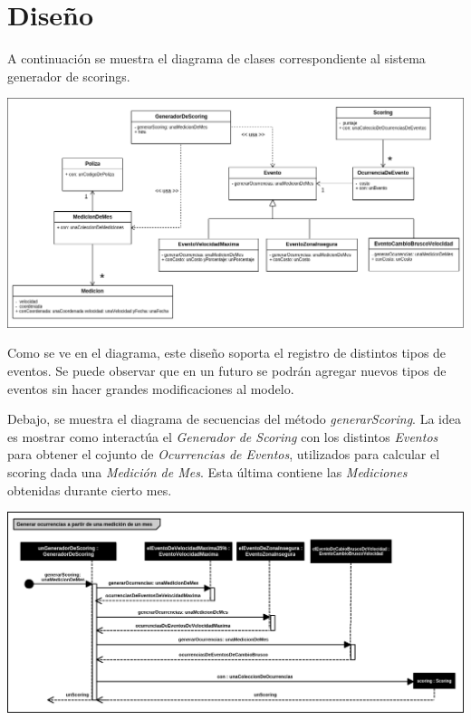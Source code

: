 \section{Diseño}

A continuación se muestra el diagrama de clases correspondiente al sistema generador 
de scorings.
\newline

\centerline{\includegraphics[width=1\textwidth]{./imagenes/clases.png}}


Como se ve en el diagrama, este diseño soporta el registro de distintos tipos de 
eventos. Se puede observar que en un futuro se podrán agregar nuevos tipos de eventos 
sin hacer grandes modificaciones al modelo.




Debajo, se muestra el diagrama de secuencias del método \textit{generarScoring}.
La idea es mostrar como interactúa el \textit{Generador de Scoring} con los distintos
\textit{Eventos} para obtener el cojunto de \textit{Ocurrencias de Eventos}, utilizados
para calcular el scoring dada una \textit{Medición de Mes}. Esta última contiene las 
\textit{Mediciones} obtenidas durante cierto mes.
\newline

\centerline{\includegraphics[width=1\textwidth]{./imagenes/secuencias_general.png}}

